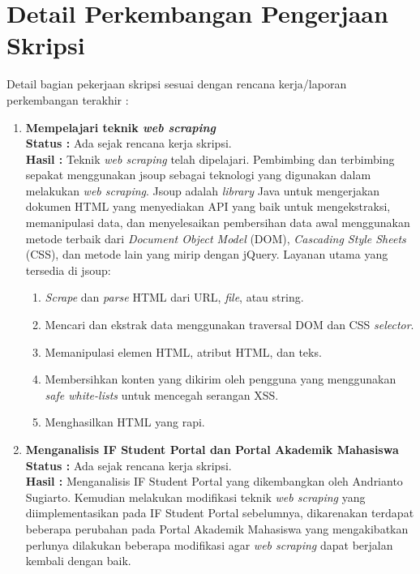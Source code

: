 \documentclass[a4paper,twoside]{article}
\begin{document}
\section{Detail Perkembangan Pengerjaan Skripsi}
Detail bagian pekerjaan skripsi sesuai dengan rencana kerja/laporan perkembangan terakhir :
	\begin{enumerate}
		\item \textbf{Mempelajari teknik \textit{web scraping}}\\
		{\bf Status :} Ada sejak rencana kerja skripsi.\\
		{\bf Hasil :} Teknik \textit{web scraping} telah dipelajari. Pembimbing dan terbimbing sepakat menggunakan jsoup sebagai teknologi yang digunakan dalam melakukan \textit{web scraping}. Jsoup adalah \textit{library} Java untuk mengerjakan dokumen HTML yang menyediakan API yang baik untuk mengekstraksi, memanipulasi data, dan menyelesaikan pembersihan data awal menggunakan metode terbaik dari \textit{Document Object Model} (DOM), \textit{Cascading Style Sheets} (CSS), dan metode lain yang mirip dengan jQuery. Layanan utama yang tersedia di jsoup:
        \begin{enumerate}
            \item \textit{Scrape} dan \textit{parse} HTML dari URL, \textit{file}, atau string.
            \item Mencari dan ekstrak data menggunakan traversal DOM dan CSS \textit{selector}.
            \item Memanipulasi elemen HTML, atribut HTML, dan teks.
            \item Membersihkan konten yang dikirim oleh pengguna yang menggunakan \textit{safe white-lists} untuk mencegah serangan XSS.
            \item Menghasilkan HTML yang rapi.
        \end{enumerate}
		
		
		\item \textbf{Menganalisis IF Student Portal dan Portal Akademik Mahasiswa}\\
		{\bf Status :} Ada sejak rencana kerja skripsi.\\
		{\bf Hasil :} Menganalisis IF Student Portal yang dikembangkan oleh Andrianto Sugiarto. Kemudian melakukan modifikasi teknik \textit{web scraping} yang diimplementasikan pada IF Student Portal sebelumnya, dikarenakan terdapat beberapa perubahan pada Portal Akademik Mahasiswa yang mengakibatkan perlunya dilakukan beberapa modifikasi agar \textit{web scraping} dapat berjalan kembali dengan baik.



\end{enumerate}
\end{document}
